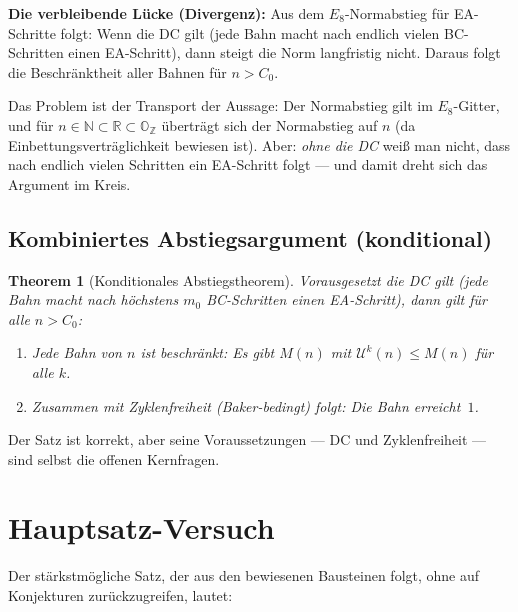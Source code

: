\documentclass[12pt,a4paper]{article}
\newtheorem{theorem}[definition]{Theorem}
\newcommand{\U}{\mathcal{U}}
\newcommand{\N}{\mathbb{N}}
\newcommand{\Z}{\mathbb{Z}}
\newcommand{\R}{\mathbb{R}}
\begin{document}
\begin{tcolorbox}[warnung]
\textbf{Die verbleibende Lücke (Divergenz):}
Aus dem $E_8$-Normabstieg für EA-Schritte folgt: Wenn die DC gilt
(jede Bahn macht nach endlich vielen BC-Schritten einen EA-Schritt),
dann steigt die Norm langfristig nicht. Daraus folgt die Beschränktheit
aller Bahnen für $n > C_0$.

Das Problem ist der Transport der Aussage: Der Normabstieg gilt im
$E_8$-Gitter, und für $n \in \N \subset \R \subset \mathbb{O}_{\Z}$
überträgt sich der Normabstieg auf $n$ (da Einbettungsverträglichkeit bewiesen ist).
Aber: \emph{ohne die DC} weiß man nicht, dass nach endlich vielen Schritten
ein EA-Schritt folgt --- und damit dreht sich das Argument im Kreis.
\end{tcolorbox}

\subsection{Kombiniertes Abstiegsargument (konditional)}

\begin{theorem}[Konditionales Abstiegstheorem]
\label{thm:abstieg}
Vorausgesetzt die DC gilt (jede Bahn macht nach höchstens $m_0$ BC-Schritten
einen EA-Schritt), dann gilt für alle $n > C_0$:
\begin{enumerate}[label=(\roman*)]
  \item Jede Bahn von $n$ ist beschränkt: Es gibt $M(n)$ mit
    $\U^k(n) \leq M(n)$ für alle $k$.
  \item Zusammen mit Zyklenfreiheit (Baker-bedingt) folgt:
    Die Bahn erreicht~$1$.
\end{enumerate}
\end{theorem}

Der Satz ist korrekt, aber seine Voraussetzungen --- DC und Zyklenfreiheit ---
sind selbst die offenen Kernfragen.

\section{Hauptsatz-Versuch}
\label{sec:hauptsatz}

Der stärkstmögliche Satz, der aus den bewiesenen Bausteinen folgt,
ohne auf Konjekturen zurückzugreifen, lautet:
\end{document}
